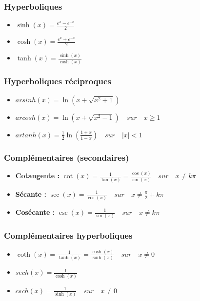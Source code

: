 \documentclass[12]{article}%
\theoremstyle{plain}
\theoremstyle{definition}
\theoremstyle{remark}
\begin{document}
\subsubsection{Hyperboliques}
\begin{itemize}
	\item \( \boxed{\sinh(x) = \frac{e^{x} - e^{-x}}{2}} \)
	\item \( \boxed{\cosh(x) = \frac{e^{x} + e^{-x}}{2}} \)
	\item \( \boxed{\tanh(x) = \frac{\sinh(x)}{\cosh(x)}} \)
\end{itemize}

\subsubsection{Hyperboliques réciproques}
\begin{itemize}
	\item \( \boxed{arsinh(x) = \ln\left(x + \sqrt{x^2 + 1}\right)} \)
	\item \( \boxed{arcosh(x) = \ln\left(x + \sqrt{x^2 - 1}\right)} \quad sur \quad x \geq 1 \)
	\item \( \boxed{artanh(x) = \frac{1}{2} \ln\left(\frac{1 + x}{1 - x}\right)} \quad sur \quad |x| < 1 \)
\end{itemize}

\subsubsection{Complémentaires (secondaires)}
\begin{itemize}
	\item \textbf{Cotangente :} \( \boxed{\cot(x) = \frac{1}{\tan(x)} = \frac{\cos(x)}{\sin(x)}} \quad sur \quad x \neq k\pi \)
	\item \textbf{Sécante :} \( \boxed{\sec(x) = \frac{1}{\cos(x)}} \quad sur \quad x \neq \frac{\pi}{2} + k\pi \)
	\item \textbf{Cosécante :} \( \boxed{\csc(x) = \frac{1}{\sin(x)}} \quad sur \quad x \neq k\pi \)
\end{itemize}

\subsubsection{Complémentaires hyperboliques}
\begin{itemize}
	\item \( \boxed{\coth(x) = \frac{1}{\tanh(x)} = \frac{\cosh(x)}{\sinh(x)} } \quad sur \quad x \neq 0 \)
	\item \( \boxed{sech(x) = \frac{1}{\cosh(x)}} \)
	\item \( \boxed{csch(x) = \frac{1}{\sinh(x)}} \quad sur \quad x \neq 0 \)
\end{itemize}
\end{document}
